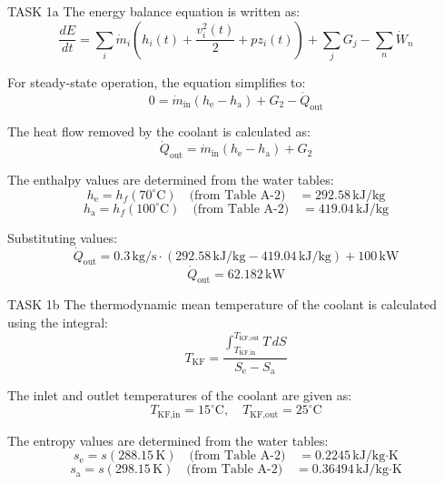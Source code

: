 TASK 1a  
The energy balance equation is written as:  
\[
\frac{dE}{dt} = \sum_i \dot{m}_i \left( h_i(t) + \frac{v_i^2(t)}{2} + pz_i(t) \right) + \sum_j G_j - \sum_n \dot{W}_n
\]  

For steady-state operation, the equation simplifies to:  
\[
0 = \dot{m}_{\text{in}} (h_{\text{e}} - h_{\text{a}}) + G_2 - \dot{Q}_{\text{out}}
\]  

The heat flow removed by the coolant is calculated as:  
\[
\dot{Q}_{\text{out}} = \dot{m}_{\text{in}} (h_{\text{e}} - h_{\text{a}}) + G_2
\]  

The enthalpy values are determined from the water tables:  
\[
h_{\text{e}} = h_f(70^\circ\text{C}) \quad \text{(from Table A-2)} \quad = 292.58 \, \text{kJ/kg}
\]  
\[
h_{\text{a}} = h_f(100^\circ\text{C}) \quad \text{(from Table A-2)} \quad = 419.04 \, \text{kJ/kg}
\]  

Substituting values:  
\[
\dot{Q}_{\text{out}} = 0.3 \, \text{kg/s} \cdot (292.58 \, \text{kJ/kg} - 419.04 \, \text{kJ/kg}) + 100 \, \text{kW}
\]  
\[
\dot{Q}_{\text{out}} = 62.182 \, \text{kW}
\]  

TASK 1b  
The thermodynamic mean temperature of the coolant is calculated using the integral:  
\[
T_{\text{KF}} = \frac{\int_{T_{\text{KF,in}}}^{T_{\text{KF,out}}} T \, dS}{S_{\text{e}} - S_{\text{a}}}
\]  

The inlet and outlet temperatures of the coolant are given as:  
\[
T_{\text{KF,in}} = 15^\circ\text{C}, \quad T_{\text{KF,out}} = 25^\circ\text{C}
\]  

The entropy values are determined from the water tables:  
\[
s_{\text{e}} = s(288.15 \, \text{K}) \quad \text{(from Table A-2)} \quad = 0.2245 \, \text{kJ/kg·K}
\]  
\[
s_{\text{a}} = s(298.15 \, \text{K}) \quad \text{(from Table A-2)} \quad = 0.36494 \, \text{kJ/kg·K}
\]  
